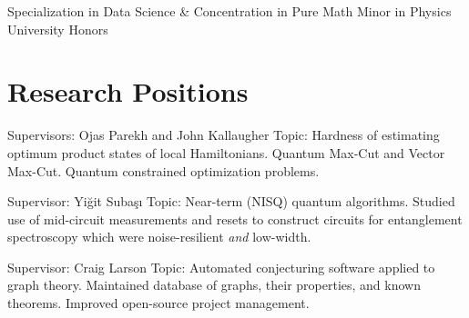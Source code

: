 \documentclass[11pt,letterpaper,serif]{moderncv}
\begin{document}
{}{}

\smallskip

\vspace{-\parsep}
{
	\begin{adjustwidth}{.25in}{}
		Specialization in Data Science \&
		Concentration in Pure Math \newline
		Minor in Physics \newline
		University Honors
	\end{adjustwidth}
}

%
\section{Research Positions}
{
	\begin{adjustwidth}{.25in}{}
		Supervisors: Ojas Parekh and John Kallaugher \newline
		Topic: Hardness of estimating optimum product states of local Hamiltonians. Quantum Max-Cut and Vector Max-Cut. Quantum constrained optimization problems.
	\end{adjustwidth}
}

{
	\begin{adjustwidth}{.25in}{}
		Supervisor: Yi\u{g}it Suba\c{s}\i \newline
		Topic: Near-term (NISQ) quantum algorithms. Studied use of mid-circuit measurements and resets to construct circuits for entanglement spectroscopy which were noise-resilient \textit{and} low-width.
	\end{adjustwidth}
}

{
	\begin{adjustwidth}{.25in}{}
		Supervisor: Craig Larson \newline
		Topic: Automated conjecturing software applied to graph theory. Maintained database of graphs, their properties, and known theorems. Improved open-source project management.
	\end{adjustwidth}
}
\end{document}
